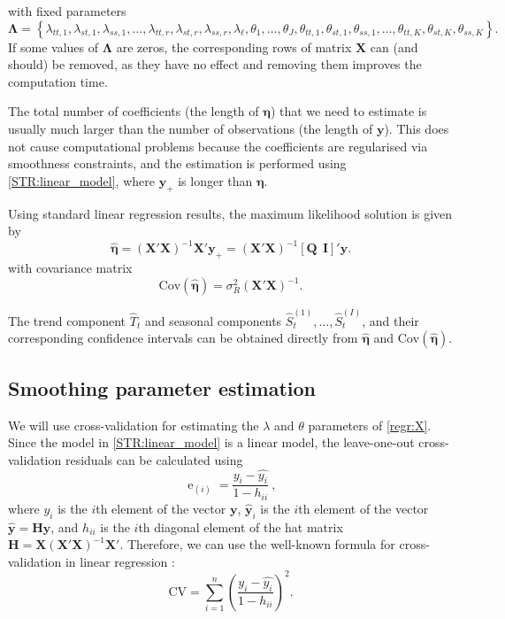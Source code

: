 \documentclass[ijds,nonblindrev]{informs-ijds}
\begin{document}
with fixed parameters
\[
  \bm{\Lambda} = \left\{\lambda_{tt,1}, \lambda_{st,1}, \lambda_{ss,1},
    \dots, \lambda_{tt,r}, \lambda_{st,r}, \lambda_{ss,r}, \lambda_\ell,
    \theta_1, \dots, \theta_J, \theta_{tt,1}, \theta_{st,1}, \theta_{ss,1},
    \dots, \theta_{tt,K}, \theta_{st,K}, \theta_{ss,K}
  \right\}.
\]
If some values of \(\bm{\Lambda}\) are zeros, the corresponding rows of matrix \(\bm{X}\) can (and should) be removed, as they have no effect and removing them improves the computation time.

The total number of coefficients (the length of \(\bm{\eta}\)) that we need to estimate is usually much larger than the number of observations (the length of \(\bm{y}\)). This does not cause computational problems because the coefficients are regularised via smoothness constraints, and the estimation is performed using \eqref{STR:linear_model}, where \(\bm{y}_{+}\) is longer than \(\bm{\eta}\).

Using standard linear regression results, the maximum likelihood solution is given by
\begin{equation}
  \label{STR:solution}
  \hat{\bm\eta} = (\bm{X}'\bm{X})^{-1}\bm{X}'\bm{y}_{+} = (\bm{X}'\bm{X})^{-1}[\bm{Q} ~~ \bm{I}]'\bm{y} .
\end{equation}
with covariance matrix
\begin{equation}
  \label{STR:beta_covar2}
  \text{Cov}(\hat{\bm\eta}) = \sigma_R^2 (\bm{X}'\bm{X})^{-1} .
\end{equation}

The trend component \(\hat{T}_t\) and seasonal components \(\hat{S}_t^{(1)},\dots,\hat{S}_t^{(I)}\), and their corresponding confidence intervals can be obtained directly from \(\hat{\bm\eta}\) and \(\text{Cov}(\hat{\bm\eta})\).

\hypertarget{sec:find_params}{%
\subsection{Smoothing parameter estimation}\label{sec:find_params}}

We will use cross-validation for estimating the \(\lambda\) and \(\theta\) parameters of \eqref{regr:X}. Since the model in \eqref{STR:linear_model} is a linear model, the leave-one-out cross-validation residuals can be calculated \citep[see][]{seber2012linear} using
\begin{equation}
  \label{FindLambdas:residuals}
  \operatorname{e}_{(i)} = \frac{y_i-\hat{y_i}}{1-h_{ii}}\ ,
\end{equation}
where \(y_i\) is the \(i\)th element of the vector \(\bm{y}\), \(\hat{\bm y}_i\) is the \(i\)th element of the vector \(\hat{\bm y} = \bm{H}\bm{y}\), and \(h_{ii}\) is the \(i\)th diagonal element of the hat matrix \(\bm{H} = \bm{X}(\bm{X}'\bm{X})^{-1}\bm{X}'\).
Therefore, we can use the well-known formula for cross-validation in linear regression \citep[see, for example,][p.45]{RWC02}:
\begin{equation}
  \label{FindLambdas:CV}
  \text{CV} = \sum_{i=1}^{n}\left(\frac{y_i-\hat{y_i}}{1-h_{ii}}\right)^2.
\end{equation}
\end{document}
